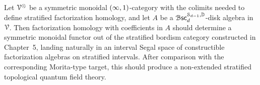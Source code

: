 \begin{conjecture}
    Let $\mathcal V^{\otimes}$ be a symmetric monoidal $(\operatorname{\infty},1)$-category with the colimits needed to define stratified factorization homology, and let $A$ be a $\operatorname{\mathcal B\mathsf{sc}}_{d}^{\mathcal S_{d-1},\mathbb D}$-disk algebra in $\mathcal V$. Then factorization homology with coefficients in $A$ should determine a symmetric monoidal functor out of the stratified bordism category constructed in Chapter~5, landing naturally in an interval Segal space of constructible factorization algebras on stratified intervals. After comparison with the corresponding Morita-type target, this should produce a non-extended stratified topological quantum field theory.
\end{conjecture}

















